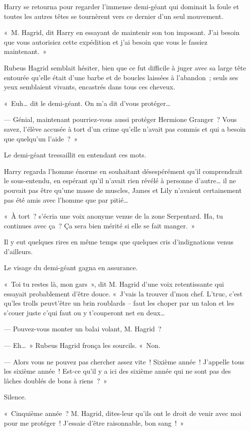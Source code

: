 Harry se retourna pour regarder l'immense demi-géant qui dominait la foule et toutes les autres têtes se tournèrent vers ce dernier d'un seul mouvement.

«~M. Hagrid, dit Harry en essayant de maintenir son ton imposant.
J'ai besoin que vous autorisiez cette expédition et j'ai besoin que vous le fassiez maintenant.~»

Rubeus Hagrid semblait hésiter, bien que ce fut difficile à juger avec sa large tête entourée qu'elle était d'une barbe et de boucles laissées à l'abandon~; seuls ses yeux semblaient vivants, encastrés dans tous ces cheveux.

«~Euh… dit le demi-géant.
On m'a dit d'vous protéger…

--- Génial, maintenant pourriez-vous aussi protéger Hermione Granger~?
Vous savez, l'élève accusée à tort d'un crime qu'elle n'avait pas commis et qui a besoin que quelqu'un l'aide~?~»

Le demi-géant tressaillit en entendant ces mots.

Harry regarda l'homme énorme en souhaitant désespérément qu'il comprendrait le sous-entendu, en espérant qu'il n'avait rien révélé à personne d'autre… il ne pouvait pas être qu'une masse de muscles, James et Lily n'avaient certainement pas été amis avec l'homme que par pitié…

«~À tort~? s'écria une voix anonyme venue de la zone Serpentard.
Ha, tu continues avec ça~?
Ça sera bien mérité si elle se fait manger.~»

Il y eut quelques rires en même temps que quelques cris d'indignations venus d'ailleurs.

Le visage du demi-géant gagna en assurance.

«~Toi tu restes là, mon gars~», dit M. Hagrid d'une voix retentissante qui essayait probablement d'être douce.
«~J'vais la trouver d'mon chef.
L'truc, c'est qu'les trolls peuvt'être un brin roublards -- faut les choper par un talon et les s'couer juste c'qui faut ou y t'couperont net en deux…

--- Pouvez-vous monter un balai volant, M. Hagrid~?

--- Eh…~» Rubeus Hagrid fronça les sourcils.
«~Non.

--- Alors vous ne pouvez pas chercher assez vite~!
Sixième année~!
J'appelle tous les sixième année~!
Est-ce qu'il y a ici des sixième année qui ne sont pas des lâches doublés de bons à riens~?~»

Silence.

«~Cinquième année~?
M. Hagrid, dites-leur qu'ils ont le droit de venir avec moi pour me protéger~!
J'essaie d'être raisonnable, bon sang~!~»

